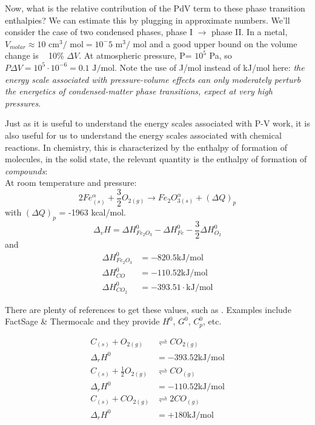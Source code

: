 \documentclass[12pt]{article}
\begin{document}
Now, what is the relative contribution of the PdV term to these phase transition enthalpies?  We can estimate this by plugging in approximate numbers. We'll consider the case of two condensed phases, phase I $\rightarrow$ phase II.  In a metal, $V_{molar} \approx 10 \text{ cm}^3\text{/ mol}=10^-5 \text{ m}^3\text{/ mol}$ and a good upper bound on the volume change is ~ 10\% $\Delta V$.  At atmospheric pressure, P\degree = $10^5$ Pa, so $P \Delta V = 10^5 \cdot 10^{-6} = 0.1 \text{ J/mol}$. Note the use of J/mol instead of kJ/mol here: \emph{the energy scale associated with pressure-volume effects can only moderately perturb the energetics of condensed-matter phase transitions, expect at very high pressures}.

Just as it is useful to understand the energy scales associated with P-V work, it is also useful for us to understand the energy scales associated with chemical reactions. In chemistry, this is characterized by the enthalpy of formation of molecules, in the solid state, the relevant quantity is the enthalpy of formation of \emph{compounds}:\\
At room temperature and pressure:
\begin{equation}
2 Fe_{(s)}^{\alpha} + \frac{3}{2}O_{2 (g)} \rightarrow Fe_2O_{3 (s)}^{\alpha} + (\Delta Q)_p
\end{equation}
with $(\Delta Q)_p$ = -1963 kcal/mol.
\begin{equation}
\Delta_v H = \Delta H^0_{Fe_2O_3} - \Delta H^0_{Fe} - \frac{3}{2} \Delta H^0_{O_2}
\end{equation}
and
\begin{align*}
\Delta H^0_{Fe_2O_3} &= -820.5 \text{kJ}/\text{mol}\\
\Delta H^0_{CO} &= -110.52 \text{kJ}/\text{mol}\\
\Delta H^0_{CO_2} &= -393.51 \cdot \text{kJ}/\text{mol}
\end{align*}

There are plenty of references to get these values, such as .  Examples include FactSage \& Thermocalc and they provide $H^0$, $G^0$, $C_p^0$, etc.

\begin{align*}
C_{(s)} + O_{2 (g)} &\rightleftharpoons CO_{2 (g)}\\
\Delta_r H^0 &= -393.52 \text{kJ}/\text{mol}\\
C_{(s)} + \frac{1}{2} O_{2 (g)} &\rightleftharpoons CO_{(g)}\\
\Delta_r H^0 &= -110.52 \text{kJ}/\text{mol}\\
C_{(s)} + CO_{2 (g)} &\rightleftharpoons 2 CO_{(g)}\\
\Delta_r H^0 &= +180 \text{kJ}/\text{mol}\\
\end{align*}
\end{document}
